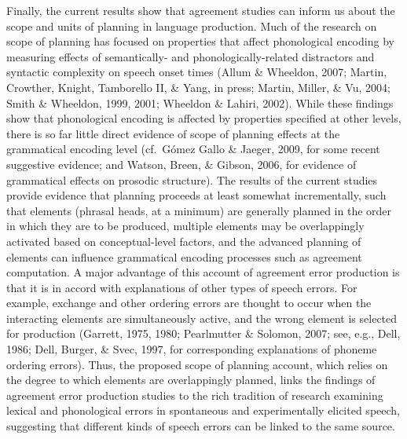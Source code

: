 \documentclass[12pt,titlepage]{article}
\newcommand{\IGNORE}[1]{} %
\begin{document}
\IGNORE{\subsection{Conclusion}}

Finally, the current results show that agreement studies can inform us
about the scope and units of planning in language production.  Much of the
research on scope of planning has focused on properties that affect
phonological encoding by measuring effects of semantically- and
phonologically-related distractors and syntactic complexity on speech onset
times (Allum \& Wheeldon, 2007; Martin, Crowther, Knight, Tamborello II, \&
Yang, in press; Martin, Miller, \& Vu, 2004; Smith \& Wheeldon, 1999, 2001;
Wheeldon \& Lahiri, 2002).  While these findings show that phonological
encoding is affected by properties specified at other levels, there is so
far little direct evidence of scope of planning effects at the grammatical
encoding level (cf.\ G\'{o}mez Gallo \& Jaeger, 2009, for some recent
suggestive evidence; and Watson, Breen, \& Gibson, 2006, for evidence of
grammatical effects on prosodic structure).\IGNORE{ Recent work by
G\'{o}mez Gallo and Jaeger (2009) has shown that the complexity of upcoming
arguments influences verb choice, and ultimately the syntactic structure of
the utterance, suggesting that speakers do some advanced planning of
elements within an utterance and that this planning affects the grammatical
encoding process.  --- I dropped this sentence b/c it wasn't clear what it
was getting us --- just the suggestion that there's advance planning isn't
so strong, and saying the advance planning affects encoding is pretty much
tautological.} The results of the current studies provide evidence that
planning proceeds at least somewhat incrementally, such that elements
(phrasal heads, at a minimum) are generally planned in the order in which
they are to be produced, multiple elements may be overlappingly activated
based on conceptual-level factors, and the advanced planning of elements
can influence grammatical encoding processes such as agreement computation.
A major advantage of this account of agreement error production is that it
is in accord with explanations of other types of speech errors.  For
example, exchange and other ordering errors are thought to occur when the
interacting elements are simultaneously active, and the wrong element is
selected for production (Garrett, 1975, 1980; Pearlmutter \& Solomon, 2007;
see, e.g., Dell, 1986; Dell, Burger, \& Svec, 1997, for corresponding
explanations of phoneme ordering errors).  Thus, the proposed scope of
planning account, which relies on the degree to which elements are
overlappingly planned, links the findings of agreement error production
studies to the rich tradition of research examining lexical and
phonological errors in spontaneous and experimentally elicited speech,
suggesting that different kinds of speech errors can be linked to the same
source.
\end{document}
